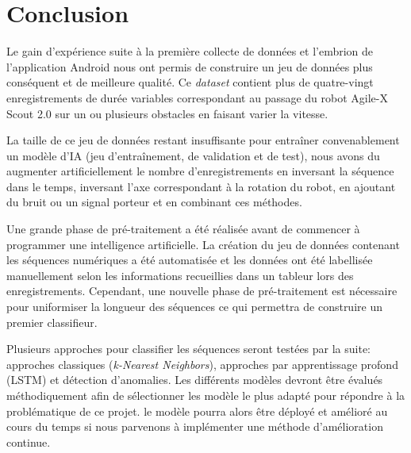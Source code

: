 \section{Conclusion}
Le gain d'expérience suite à la première collecte de données et l'embrion de l'application Android nous ont permis de construire un jeu de données plus conséquent et de meilleure qualité. Ce \textit{dataset} contient plus de quatre-vingt enregistrements de durée variables correspondant au passage du robot Agile-X Scout 2.0 sur un ou plusieurs obstacles en faisant varier la vitesse.

La taille de ce jeu de données restant insuffisante pour entraîner convenablement un modèle d'IA (jeu d'entraînement, de validation et de test), nous avons du augmenter artificiellement le nombre d'enregistrements en inversant la séquence dans le temps, inversant l'axe correspondant à la rotation du robot, en ajoutant du bruit ou un signal porteur et en combinant ces méthodes.

Une grande phase de pré-traitement a été réalisée avant de commencer à programmer une intelligence artificielle. La création du jeu de données contenant les séquences numériques a été automatisée et les données ont été labellisée manuellement selon les informations recueillies dans un tableur lors des enregistrements.
Cependant, une nouvelle phase de pré-traitement est nécessaire pour uniformiser la longueur des séquences ce qui permettra de construire un premier classifieur.

Plusieurs approches pour classifier les séquences seront testées par la suite: approches classiques (\textit{k-Nearest Neighbors}), approches par apprentissage profond (LSTM) et détection d'anomalies. Les différents modèles devront être évalués méthodiquement afin de sélectionner les modèle le plus adapté pour répondre à la problématique de ce projet. le modèle pourra alors être déployé et amélioré au cours du temps si nous parvenons à implémenter une méthode d'amélioration continue.
